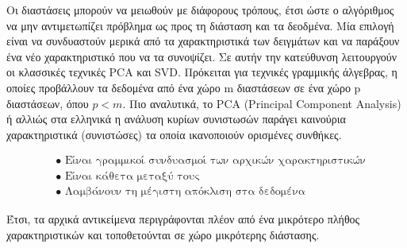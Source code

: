 \documentclass[12pt]{article}
\begin{document}
Οι διαστάσεις μπορούν να μειωθούν με διάφορους τρόπους, έτσι ώστε ο αλγόριθμος να μην αντιμετωπίζει πρόβλημα ως προς τη διάσταση και τα δεοδμένα. Μία επιλογή είναι να συνδυαστούν μερικά από τα χαρακτηριστικά των δειγμάτων και να παράξουν ένα νέο χαρακτηριστικό που να τα συνοψίζει. Σε αυτήν την κατεύθυνση λειτουργούν οι κλασσικές τεχνικές PCA και SVD. Πρόκειται για τεχνικές γραμμικής άλγεβρας, η οποίες προβάλλουν τα δεδομένα από ένα χώρο m διαστάσεων σε ένα χώρο p διαστάσεων, όπου \(p < m\). Πιο αναλυτικά, το PCA (Principal Component Analysis) ή αλλιώς στα ελληνικά η ανάλυση κυρίων συνιστωσών παράγει καινούρια χαρακτηριστικά (συνιστώσες) τα οποία ικανοποιούν ορισμένες συνθήκες.

\begin{align*}
	& \bullet \text{ Είναι γραμμικοί συνδυασμοί των αρχικών χαρακτηριστικών} \\
	& \bullet \text{ Είναι κάθετα μεταξύ τους} \\
	& \bullet \text{ Λαμβάνουν τη μέγιστη απόκλιση στα δεδομένα}
\end{align*}

Έτσι, τα αρχικά αντικείμενα περιγράφονται πλέον από ένα μικρότερο πλήθος χαρακτηριστικών και τοποθετούνται σε χώρο μικρότερης διάστασης. \\
\end{document}
